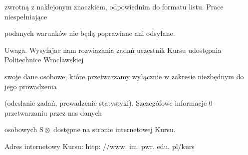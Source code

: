 \documentclass[a4paper,12pt]{article}
\begin{document}
zwrotną $\mathrm{z}$ naklejonym znaczkiem, odpowiednim do formatu listu. Prace niespełniające

podanych warunków nie będą poprawiane ani odsyłane.

Uwaga. Wysyfajac nam rozwiazania zadań uczestnik Kursu udostępnia Politechnice Wroclawskiej

swoje dane osobowe, które przetwarzamy wyłącznie $\mathrm{w}$ zakresie niezbędnym do jego prowadzenia

(odeslanie zadań, prowadzenie statystyki). Szczegófowe informacje $0$ przetwarzaniu przez nas danych

osobowych $\mathrm{S}\otimes$ dostępne na stronie internetowej Kursu.

Adres internetowy Kursu: http: //www. im. pwr. edu. pl/kurs
\end{document}

